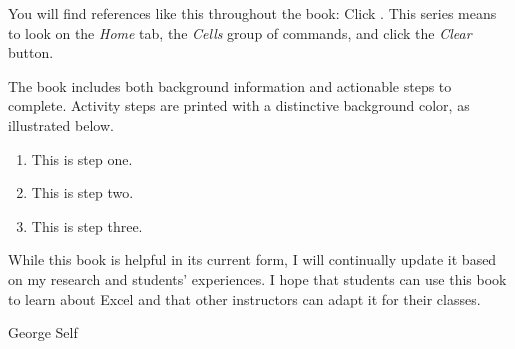 You will find references like this throughout the book: Click . This series means to look on the \textit{Home} tab, the \textit{Cells} group of commands, and click the \textit{Clear} button.

The book includes both background information and actionable steps to complete. Activity steps are printed with a distinctive background color, as illustrated below.

\begin{enumbox}
	\begin{enumerate}
	\item This is step one.
	\item This is step two.
	\item This is step three.
	\end{enumerate}
\end{enumbox}

While this book is helpful in its current form, I will continually update it based on my research and students' experiences. I hope that students can use this book to learn about Excel and that other instructors can adapt it for their classes.

\bigskip
\begin{flushright}
  \textemdash \; George Self
\end{flushright}

